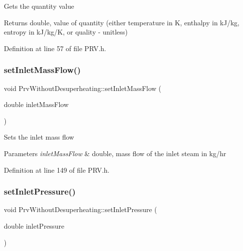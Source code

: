 Gets the quantity value

\begin{DoxyReturn}{Returns}
double, value of quantity (either temperature in K, enthalpy in k\+J/kg, entropy in k\+J/kg/K, or quality -\/ unitless) 
\end{DoxyReturn}


Definition at line 57 of file P\+R\+V.\+h.

\mbox{\label{class_prv_without_desuperheating_abeccff2dc91144452b34ca343ee63fa7}} 
\subsubsection{\texorpdfstring{set\+Inlet\+Mass\+Flow()}{setInletMassFlow()}}
{\footnotesize\ttfamily void Prv\+Without\+Desuperheating\+::set\+Inlet\+Mass\+Flow (\begin{DoxyParamCaption}\item[{double}]{inlet\+Mass\+Flow }\end{DoxyParamCaption})\hspace{0.3cm}{\ttfamily [inline]}}

Sets the inlet mass flow


\begin{DoxyParams}{Parameters}
{\em inlet\+Mass\+Flow} & double, mass flow of the inlet steam in kg/hr \\
\hline
\end{DoxyParams}


Definition at line 149 of file P\+R\+V.\+h.

\mbox{\label{class_prv_without_desuperheating_a26039a0a228ca66f96e8402bf741b9d9}} 
\subsubsection{\texorpdfstring{set\+Inlet\+Pressure()}{setInletPressure()}}
{\footnotesize\ttfamily void Prv\+Without\+Desuperheating\+::set\+Inlet\+Pressure (\begin{DoxyParamCaption}\item[{double}]{inlet\+Pressure }\end{DoxyParamCaption})\hspace{0.3cm}{\ttfamily [inline]}}

